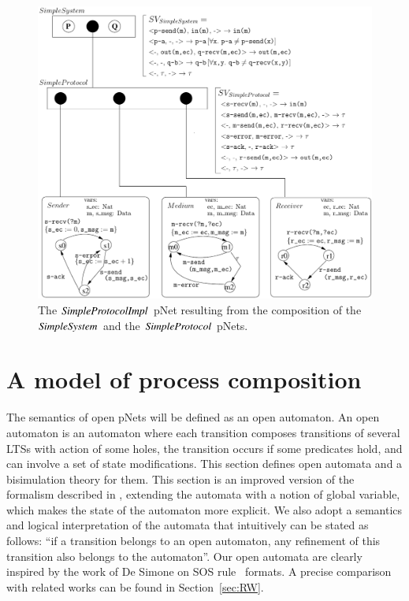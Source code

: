 \documentclass{elsarticle}
\begin{document}
  
\begin{figure}[t]
  \centerline{\includegraphics[width=.95\textwidth]{XFIG/SimpleProt2-pNet-tau}}
  \caption{The $\symb{SimpleProtocolImpl}$ pNet resulting from the composition of  the $\symb{SimpleSystem}$  and the $\symb{SimpleProtocol}$ pNets.}  \label{SimpleProt:Impl}
\end{figure}



\section{A model of process composition}\label{sec:OT}



The semantics of open pNets will be defined  as an open automaton. An open
automaton is an automaton where each transition composes transitions of several LTSs with
action of some holes, the transition occurs if some predicates hold, and can involve a 
set of state modifications. This section defines open automata and a bisimulation theory for them. This section is an improved version of the formalism described in \cite{henrio:Forte2016}, extending the automata with a notion of global variable, which makes the state of the automaton more explicit. We also adopt a semantics and logical interpretation of the automata that intuitively can be stated as follows: ``if a transition belongs to an open automaton, any refinement of this transition also belongs to the automaton''. {Our open automata are clearly inspired by the work  of De Simone on  SOS rule~\cite{deSimone85} formats. A precise comparison with related works can be found in Section~\ref{sec:RW}.}
\end{document}
